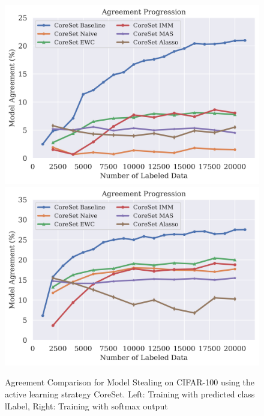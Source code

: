 \begin{figure}[!htb]
    \centering
    \includegraphics[width=0.48\linewidth]{images/results_CALMS/cifar100_label_coreset.png} \hfill
    \includegraphics[width=0.48\linewidth]{images/results_CALMS/cifar100_softmax_coreset.png}
    \caption{Agreement Comparison for Model Stealing on CIFAR-100 using the active learning strategy CoreSet. Left: Training with predicted class lLabel,
    Right: Training with softmax output}
    \label{fig:CALMSCIFAR100CoreSet}
\end{figure}

